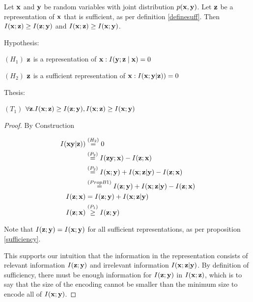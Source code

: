 \begin{lemma}
    Let ${\mathbf{x}}$ and ${\mathbf{y}}$ be random variables with joint distribution $p({\mathbf{x}}, {\mathbf{y}})$. Let ${\mathbf{z}}$ be a representation of ${\mathbf{x}}$ that is sufficient, as per definition \ref{definesuff}. Then $I({\mathbf{x}};{\mathbf{z}}) \geq I({\mathbf{z}};{\mathbf{y}})$ and $I({\mathbf{x}};{\mathbf{z}}) \geq I({\mathbf{x}};{\mathbf{y}})$. 

    Hypothesis: 

    $(H_1)$ ${\mathbf{z}}$ is a representation of ${\mathbf{x}}: I({\mathbf{y}} ; {\mathbf{z}} \mid {\mathbf{x}})=0$
    
    $(H_2)$ $ {\mathbf{z}}$ is a sufficient representation of ${\mathbf{x}}: I({\mathbf{x}}; {\mathbf{y}}| {\mathbf{z}}))=0$
    
    Thesis: 
    
    $(T_1)$ $\forall {\mathbf{z}}.I({\mathbf{x}};{\mathbf{z}}) \geq I({\mathbf{z}};{\mathbf{y}}), I({\mathbf{x}};{\mathbf{z}}) \geq I({\mathbf{x}};{\mathbf{y}})$

    \begin{proof}By Construction 

    $$
    \begin{aligned}
    I({\mathbf{x}} {\mathbf{y}}|{\mathbf{z}})) &\stackrel{\left(H_2\right)}{=} 0 \\
    &\stackrel{\left(P_2\right)}{=} I({\mathbf{z}} {\mathbf{y}}; {\mathbf{x}}) - I({\mathbf{z}}; {\mathbf{x}}) \\
    &\stackrel{\left(P_2\right)}{=} I({\mathbf{x}}; {\mathbf{y}}) + I({\mathbf{x}}; {\mathbf{z}}|{\mathbf{y}}) - I({\mathbf{z}}; {\mathbf{x}}) \\
    &\stackrel{\left(PropB1\right)}{=} I({\mathbf{z}}; {\mathbf{y}}) + I({\mathbf{x}}; {\mathbf{z}}|{\mathbf{y}}) - I({\mathbf{z}};{\mathbf{x}}) \\
    I({\mathbf{z}};{\mathbf{x}}) &= I({\mathbf{z}};{\mathbf{y}}) + I({\mathbf{x}}; {\mathbf{z}}|{\mathbf{y}})\\
   I({\mathbf{z}};{\mathbf{x}}) &\stackrel{\left(P_1\right)}{\geq} I({\mathbf{z}}; {\mathbf{y}})\\
    \end{aligned}
    $$

    Note that $I({\mathbf{z}}; {\mathbf{y}}) = I({\mathbf{x}}; {\mathbf{y}})$ for all sufficient representations, as per proposition \ref{sufficiency}.

    This supports our intuition that the information in the representation consists of relevant information $I({\mathbf{z}};{\mathbf{y}})$ and irrelevant information $I({\mathbf{x}}; {\mathbf{z}}| {\mathbf{y}})$. By definition of sufficiency, there must be enough information for $I({\mathbf{z}}; {\mathbf{y}})$ in $I({\mathbf{x}}; {\mathbf{z}})$, which is to say that the size of the encoding cannot be smaller than the minimum size to encode all of $I({\mathbf{x}}; {\mathbf{y}})$. 
    
    \end{proof} 
    \label{app:domain_infobound}
\end{lemma}

